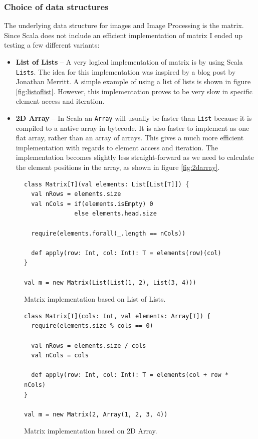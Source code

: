 \documentclass[a4paper,english]{report}
\begin{document}
\subsubsection{Choice of data structures}
\label{sec:datastructures}

The underlying data structure for images and Image Processing is the
matrix. Since Scala does not include an efficient implementation of
matrix I ended up testing a few different variants:

\begin{itemize}
\item \textbf{List of Lists} -- A very logical implementation of
  matrix is by using Scala \texttt{Lists}. The idea for this
  implementation was inspired by a blog post by Jonathan
  Merritt\cite{mer08}. A simple example of using a list of lists is
  shown in figure \vref{fig:listoflist}. However, this implementation
  proves to be very slow in specific element access and iteration.
\item \textbf{2D Array} -- In Scala an \texttt{Array} will usually be
  faster than \texttt{List} because it is compiled to a native array
  in bytecode. It is also faster to implement as one flat array,
  rather than an array of arrays. This gives a much more efficient
  implementation with regards to element access and iteration. The
  implementation becomes slightly less straight-forward as we need to
  calculate the element positions in the array, as shown in figure
  \vref{fig:2darray}.
\end{itemize}

\begin{figure}
  \begin{lstlisting}
class Matrix[T](val elements: List[List[T]]) {
  val nRows = elements.size
  val nCols = if(elements.isEmpty) 0
              else elements.head.size

  require(elements.forall(_.length == nCols))

  def apply(row: Int, col: Int): T = elements(row)(col)
}

val m = new Matrix(List(List(1, 2), List(3, 4)))
  \end{lstlisting}
  \caption{Matrix implementation based on List of
    Lists.\label{fig:listoflist}}
\end{figure}

\begin{figure}
  \begin{lstlisting}
class Matrix[T](cols: Int, val elements: Array[T]) {
  require(elements.size % cols == 0)

  val nRows = elements.size / cols
  val nCols = cols

  def apply(row: Int, col: Int): T = elements(col + row * nCols)
}

val m = new Matrix(2, Array(1, 2, 3, 4))
  \end{lstlisting}
  \caption{Matrix implementation based on 2D
    Array.\label{fig:2darray}}
\end{figure}
\end{document}
